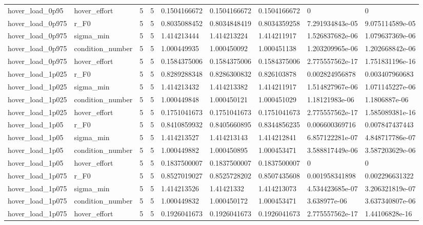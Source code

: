 \begin{tabular}{@{}lllllllll@{}}
hover\_load\_0p95 & hover\_effort & 5 & 5 & 0.1504166672 & 0.1504166672 & 0.1504166672 & 0 & 0 \\
hover\_load\_0p975 & r\_F0 & 5 & 5 & 0.8035088452 & 0.8034848419 & 0.8034359258 & 7.291934843e-05 & 9.075114589e-05 \\
hover\_load\_0p975 & sigma\_min & 5 & 5 & 1.414213444 & 1.414213224 & 1.414211917 & 1.526837682e-06 & 1.079637369e-06 \\
hover\_load\_0p975 & condition\_number & 5 & 5 & 1.000449935 & 1.000450092 & 1.000451138 & 1.203209965e-06 & 1.202668842e-06 \\
hover\_load\_0p975 & hover\_effort & 5 & 5 & 0.1584375006 & 0.1584375006 & 0.1584375006 & 2.775557562e-17 & 1.751831196e-16 \\
hover\_load\_1p025 & r\_F0 & 5 & 5 & 0.8289288348 & 0.8286300832 & 0.826103878 & 0.002824956878 & 0.003407960683 \\
hover\_load\_1p025 & sigma\_min & 5 & 5 & 1.414213432 & 1.414213382 & 1.414211917 & 1.514827967e-06 & 1.071145227e-06 \\
hover\_load\_1p025 & condition\_number & 5 & 5 & 1.000449848 & 1.000450121 & 1.000451029 & 1.18121983e-06 & 1.1806887e-06 \\
hover\_load\_1p025 & hover\_effort & 5 & 5 & 0.1751041673 & 0.1751041673 & 0.1751041673 & 2.775557562e-17 & 1.585089381e-16 \\
hover\_load\_1p05 & r\_F0 & 5 & 5 & 0.8410859932 & 0.8405660895 & 0.8344856235 & 0.006600369716 & 0.007847437443 \\
hover\_load\_1p05 & sigma\_min & 5 & 5 & 1.414213527 & 1.414213143 & 1.414212841 & 6.857122281e-07 & 4.848717786e-07 \\
hover\_load\_1p05 & condition\_number & 5 & 5 & 1.000449882 & 1.000450895 & 1.000453471 & 3.588817449e-06 & 3.587203629e-06 \\
hover\_load\_1p05 & hover\_effort & 5 & 5 & 0.1837500007 & 0.1837500007 & 0.1837500007 & 0 & 0 \\
hover\_load\_1p075 & r\_F0 & 5 & 5 & 0.8527019027 & 0.8525728202 & 0.8507435608 & 0.001958341898 & 0.002296631322 \\
hover\_load\_1p075 & sigma\_min & 5 & 5 & 1.414213526 & 1.41421332 & 1.414213073 & 4.534423685e-07 & 3.206321819e-07 \\
hover\_load\_1p075 & condition\_number & 5 & 5 & 1.000449832 & 1.000450172 & 1.000453471 & 3.638977e-06 & 3.637340807e-06 \\
hover\_load\_1p075 & hover\_effort & 5 & 5 & 0.1926041673 & 0.1926041673 & 0.1926041673 & 2.775557562e-17 & 1.44106828e-16 \\

\end{tabular}
